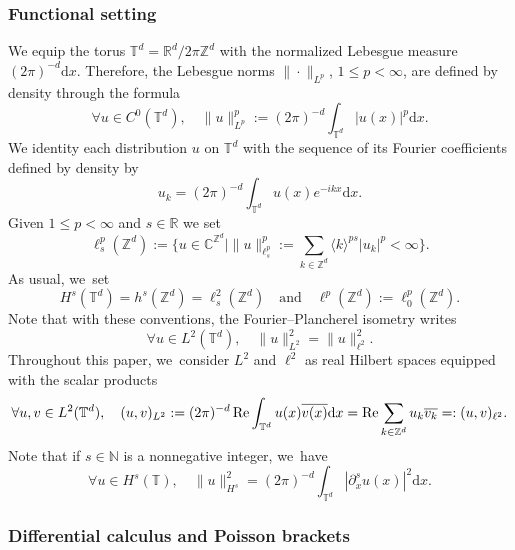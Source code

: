\documentclass[JEP,XML,SOM,Unicode,published]{cedram}
\let\ts\textstyle
\theoremstyle{plain}
\theoremstyle{definition}
\newcommand{\1}{\mathbf{1}}
\begin{document}
\label{sec:notations}
\subsubsection{Functional setting}
\label{sec:fun}
We equip the torus $\mathbb{T}^d = \mathbb{R}^d / 2\pi \mathbb{Z}^d$ with the normalized Lebesgue measure $(2\pi)^{-d}\mathrm{d}x$. Therefore, the Lebesgue norms $\|\cdot\|_{L^p}$, $1\leq p<\infty$, are defined by density through the formula\vspace*{-3pt}
\[
\forall u \in C^0(\mathbb{T}^d), \quad \| u\|_{L^p}^p:= (2\pi)^{-d}\int_{\mathbb{T}^d} |u(x)|^p \mathrm{d}x.
\]
We identity each distribution $u$ on $\mathbb{T}^d$ with the sequence of its Fourier coefficients defined by density by\vspace*{-3pt}
\[
u_k = (2\pi)^{-d} \int_{\mathbb{T}^d} u(x) e^{-ikx} \mathrm{d}x.
\]
Given $1\leq p < \infty$ and $s\in \mathbb{R}$ we set
\[
\ts
\ell^{p}_s(\mathbb{Z}^d):= \bigl\{ u\in \mathbb{C}^{\mathbb{Z}^d} \mid \|u\|_{\ell^p_s}^p := \sum_{k\in \mathbb{Z}^d} \langle k \rangle^{ps} |u_k|^p <\infty \bigr\}.
\]
As usual, we~set
\[
H^s(\mathbb{T}^d) = h^s(\mathbb{Z}^d) = \ell^2_s(\mathbb{Z}^d) \quad \mathrm{and} \quad \ell^p(\mathbb{Z}^d) := \ell^p_0(\mathbb{Z}^d).
\]
Note that with these conventions, the Fourier--Plancherel isometry writes
\[
\forall u \in L^2(\mathbb{T}^d), \quad \| u\|_{L^2}^2 = \|u\|_{\ell^2}^2.
\]
Throughout this paper, we~consider $L^2$ and $\ell^2$ as real Hilbert spaces equipped with the scalar products
\[
\forall u,v\in L^2(\mathbb{T}^d), \quad (u,v)_{L^2} :=(2\pi)^{-d} \operatorname{Re} \int_{\mathbb{T}^d} u(x) \overline{v(x)} \mathrm{d}x = \operatorname{Re} \sum_{k\in \mathbb{Z}^d} u_k \overline{v_k} =: (u,v)_{\ell^2}.
\]
Note that if $s \in \mathbb{N}$ is a nonnegative integer, we~have
\[
\forall u \in H^s(\mathbb{T}), \quad \|u\|_{H^s}^2 = (2\pi)^{-d} \int_{\mathbb{T}^d} |\partial_x^s u(x)|^2 \mathrm{d}x.
\]

\subsubsection{Differential calculus and Poisson brackets}
\end{document}
